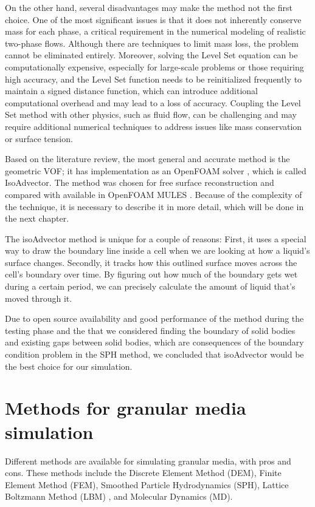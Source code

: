 On the other hand, several disadvantages may make the method not the first choice. One of the most significant issues is that it does not inherently conserve mass for each phase, a critical requirement in the numerical modeling of realistic two-phase flows. Although there are techniques to limit mass loss, the problem cannot be eliminated entirely. Moreover, solving the Level Set equation can be computationally expensive, especially for large-scale problems or those requiring high accuracy, and the Level Set function needs to be reinitialized frequently to maintain a signed distance function, which can introduce additional computational overhead and may lead to a loss of accuracy. Coupling the Level Set method with other physics, such as fluid flow, can be challenging and may require additional numerical techniques to address issues like mass conservation or surface tension.

Based on the literature review, the most general and accurate method is the geometric VOF; it has implementation as an OpenFOAM solver \cite{roenby2019isoadvector}, which is called IsoAdvector. The method was chosen for free surface reconstruction and compared with available in OpenFOAM MULES \cite{MULES}. Because of the complexity of the technique, it is necessary to describe it in more detail, which will be done in the next chapter.

The isoAdvector method is unique for a couple of reasons: First, it uses a special way to draw the boundary line inside a cell when we are looking at how a liquid's surface changes. Secondly, it tracks how this outlined surface moves across the cell's boundary over time. By figuring out how much of the boundary gets wet during a certain period, we can precisely calculate the amount of liquid that's moved through it.

Due to open source availability and good performance of the method during the testing phase and the that we considered finding the boundary of solid bodies and existing gaps between solid bodies, which are consequences of the boundary condition problem in the SPH method, we concluded that isoAdvector would be the best choice for our simulation.

\section{Methods for granular media simulation}

Different methods are available for simulating granular media, with pros and cons. These methods include the Discrete Element Method (DEM)\cite{cundall1979discrete}, Finite Element Method (FEM), Smoothed Particle Hydrodynamics (SPH)\cite{monaghan1994SPH}, Lattice Boltzmann Method (LBM) \cite{chen1998lattice} \cite{begum2008lattice}, and Molecular Dynamics (\ac{MD}).

